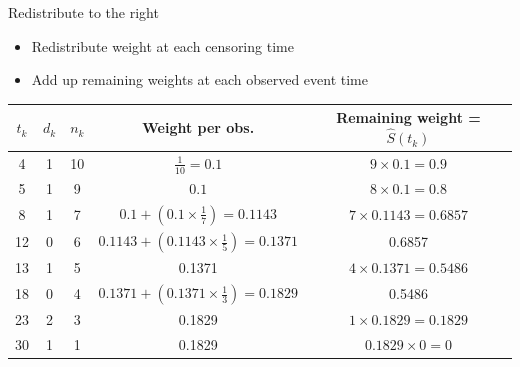 \documentclass[10pt,t]{beamer}
\begin{document}
\begin{frame}{Redistribute to the right}
	
	\vspace{-5 mm}
	
\begin{itemize}
	\item Redistribute weight at each censoring time
	
	\medskip
	
	\item Add up remaining weights at each observed event time
\end{itemize}

\smallskip

		\begin{footnotesize}
			\begin{center}
		\begin{tabular}{|c|c|c|c|c|}
			\hline
				$t_k$ & $d_k$ & $n_k$ & Weight per obs. & Remaining weight = $\widehat{S}(t_k)$ \\
			\hline
			4 & 1 & 10 & $\frac{1}{10} = 0.1$ & $9\times 0.1= 0.9$\\
			5 & 1 & 9 & $0.1$ &  $8\times 0.1= 0.8$  \\
			8 & 1 & 7 & $0.1 + (0.1\times \frac{1}{7}) = 0.1143$ & $7 \times 0.1143 = 0.6857$\\
			12 & 0 & 6 & $0.1143 +  (0.1143\times\frac{1}{5}) = 0.1371$ &  0.6857\\
			13 & 1 & 5 & 0.1371 & $4 \times 0.1371 =0.5486 $\\
			18 & 0 & 4 & $0.1371 + (0.1371\times \frac{1}{3}) = 0.1829$ & 0.5486\\
			23 & 2 & 3 & 0.1829&  $1 \times 0.1829 = 0.1829$\\
			30 & 1 & 1 & 0.1829 & $0.1829 \times 0 = 0$\\
			\hline
		\end{tabular}
	\end{center}
	\end{footnotesize}
\end{frame}
\end{document}
